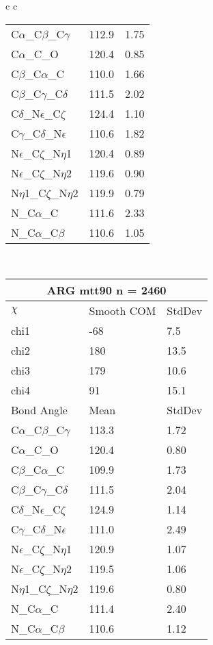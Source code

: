 \begin{longtable}{ c c }
\begin{tabular}{ l l l }
  C$\alpha$\_C$\beta$\_C$\gamma$ & 112.9 & 1.75\\
  C$\alpha$\_C\_O & 120.4 & 0.85\\
  C$\beta$\_C$\alpha$\_C & 110.0 & 1.66\\
  C$\beta$\_C$\gamma$\_C$\delta$ & 111.5 & 2.02\\
  C$\delta$\_N$\epsilon$\_C$\zeta$ & 124.4 & 1.10\\
  C$\gamma$\_C$\delta$\_N$\epsilon$ & 110.6 & 1.82\\
  N$\epsilon$\_C$\zeta$\_N$\eta$1 & 120.4 & 0.89\\
  N$\epsilon$\_C$\zeta$\_N$\eta$2 & 119.6 & 0.90\\
  N$\eta$1\_C$\zeta$\_N$\eta$2 & 119.9 & 0.79\\
  N\_C$\alpha$\_C & 111.6 & 2.33\\
  N\_C$\alpha$\_C$\beta$ & 110.6 & 1.05\\
  \bottomrule
  \end{tabular}
  \\
  \begin{tabular}{ l l l }
  \toprule
  \multicolumn{3}{c}{ARG \textbf{mtt90} n = 2460} \\ \toprule
  $\chi$       & Smooth COM & StdDev \\ \midrule
  chi1 & -68 & 7.5 \\ 
  chi2 & 180 & 13.5 \\ 
  chi3 & 179 & 10.6 \\ 
  chi4 & 91 & 15.1 \\ \midrule
  Bond Angle   & Mean     & StdDev \\ \midrule
  C$\alpha$\_C$\beta$\_C$\gamma$ & 113.3 & 1.72\\
  C$\alpha$\_C\_O & 120.4 & 0.80\\
  C$\beta$\_C$\alpha$\_C & 109.9 & 1.73\\
  C$\beta$\_C$\gamma$\_C$\delta$ & 111.5 & 2.04\\
  C$\delta$\_N$\epsilon$\_C$\zeta$ & 124.9 & 1.14\\
  C$\gamma$\_C$\delta$\_N$\epsilon$ & 111.0 & 2.49\\
  N$\epsilon$\_C$\zeta$\_N$\eta$1 & 120.9 & 1.07\\
  N$\epsilon$\_C$\zeta$\_N$\eta$2 & 119.5 & 1.06\\
  N$\eta$1\_C$\zeta$\_N$\eta$2 & 119.6 & 0.80\\
  N\_C$\alpha$\_C & 111.4 & 2.40\\
  N\_C$\alpha$\_C$\beta$ & 110.6 & 1.12\\

\end{tabular}
\end{longtable}
